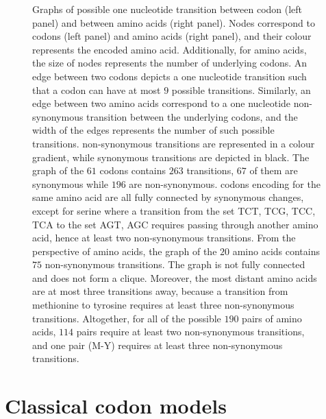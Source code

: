 \begin{figure}[htbp]
    \caption[Graphs of {codon} and amino-acid transitions]{
    Graphs of possible one nucleotide transition between \gls{codon} (left panel) and between amino acids (right panel).
    Nodes correspond to \glspl{codon} (left panel) and amino acids (right panel), and their colour represents the encoded amino acid.
    Additionally, for amino acids, the size of nodes represents the number of underlying \glspl{codon}.
    An edge between two \glspl{codon} depicts a one nucleotide transition such that a \gls{codon} can have at most $9$ possible transitions.
    Similarly, an edge between two amino acids correspond to a one nucleotide \gls{non-synonymous} transition between the underlying \glspl{codon}, and the width of the edges represents the number of such possible transitions.
    \Gls{non-synonymous} transitions are represented in a colour gradient, while \gls{synonymous} transitions are depicted in black.
    The graph of the $61$ \glspl{codon} contains $263$ transitions, $67$ of them are \gls{synonymous} while $196$ are \gls{non-synonymous}.
    \Glspl{codon} encoding for the same amino acid are all fully connected by \gls{synonymous} changes, except for serine where a transition from the set {TCT, TCG, TCC, TCA} to the set {AGT, AGC} requires passing through another amino acid, hence at least two \gls{non-synonymous} transitions.
    From the perspective of amino acids, the graph of the $20$ amino acids contains $75$ \gls{non-synonymous} transitions.
    The graph is not fully connected and does not form a clique. Moreover, the most distant amino acids are at most three transitions away, because a transition from methionine to tyrosine requires at least three \gls{non-synonymous} transitions.
    Altogether, for all of the possible $190$ pairs of amino acids, $114$ pairs require at least two \gls{non-synonymous} transitions, and one pair (M-Y) requires at least three \gls{non-synonymous} transitions.
    }
    \label{fig:graph-codons-aa}
\end{figure}


\section{Classical codon models}
\label{sec:intro-classical-codon-models}

